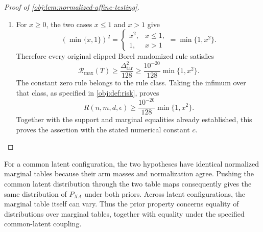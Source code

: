 \documentclass[11pt]{article}
\begin{document}
\begin{proof}[Proof of \cref{obj:lem:normalized-affine-testing}]
\begin{enumerate}
Conditional on the latent table and the channel totals, the records are independent draws from the normalized laws. Thus, on retention, their prefixes have exactly the original two-channel product law, independently of the seed. In particular,
\[
\begin{aligned}
&\mathbb E\left[
(\widetilde T-\tau_\iota)^2\mathbf1_{\mathcal E_{\mathrm{ret}}}
\mid\iota,\boldsymbol\lambda\right]\\
&\qquad=
\Pr(\mathcal E_{\mathrm{ret}}\mid\iota,\boldsymbol\lambda)
\,\mathcal R_{P_\iota(\boldsymbol\lambda)}(T)
\le\mathcal R_{\max}(T).
\end{aligned}
\]
On failure, the output is zero and \(0\le\tau_\iota\le1\), so
\[
\mathbb E\left[
(\widetilde T-\tau_\iota)^2\mathbf1_{\mathcal E_{\mathrm{ret}}^c}
\mid\iota,\boldsymbol\lambda\right]
\le\Pr(\mathcal E_{\mathrm{ret}}^c\mid\iota,\boldsymbol\lambda)
\le\frac{\Delta_{\mathrm{tar}}^2}{128}.
\]
Averaging under either latent prior gives
\[
\mathcal A_\iota(\widetilde T)
\le\mathcal R_{\max}(T)+\frac{\Delta_{\mathrm{tar}}^2}{128}.
\]
Combining this with the raw testing lower bound yields
\[
\frac{\Delta_{\mathrm{tar}}^2}{64}
\le\max_\iota\mathcal A_\iota(\widetilde T)
\le\mathcal R_{\max}(T)+\frac{\Delta_{\mathrm{tar}}^2}{128},
\qquad
\mathcal R_{\max}(T)\ge\frac{\Delta_{\mathrm{tar}}^2}{128}.
\]

\item
For \(x\ge0\), the two cases \(x\le1\) and \(x>1\) give
\[
(\min\{x,1\})^2
=
\begin{cases}
x^2,&x\le1,\\
1,&x>1
\end{cases}
=\min\{1,x^2\}.
\]
Therefore every original clipped Borel randomized rule satisfies
\[
\mathcal R_{\max}(T)
\ge\frac{\Delta_{\mathrm{tar}}^2}{128}
\ge\frac{10^{-20}}{128}\min\{1,x^2\}.
\]
The constant zero rule belongs to the rule class. Taking the infimum over that class, as specified in \cref{obj:def:risk}, proves
\[
R(n,m,d,\epsilon)
\ge\frac{10^{-20}}{128}\min\{1,x^2\}.
\]
Together with the support and marginal equalities already established, this proves the assertion with the stated numerical constant \(c\).
\end{enumerate}
\end{proof}

For a common latent configuration, the two hypotheses have identical normalized marginal tables because their arm masses and normalization agree. Pushing the common latent distribution through the two table maps consequently gives the same distribution of \(P_{XA}\) under both priors. Across latent configurations, the marginal table itself can vary. Thus the prior property concerns equality of distributions over marginal tables, together with equality under the specified common-latent coupling.
\end{document}

